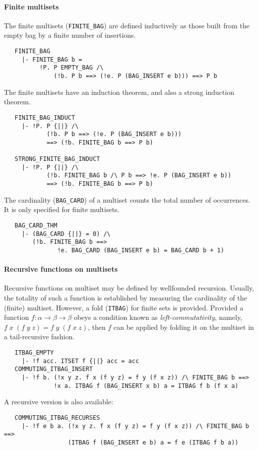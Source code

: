 \paragraph {Finite multisets}

The finite multisets ({\small\verb+FINITE_BAG+}) are defined inductively as those
built from the empty bag by a finite number of insertions.
%
{\small
\begin{verbatim}
   FINITE_BAG
     |- FINITE_BAG b =
          !P. P EMPTY_BAG /\
              (!b. P b ==> (!e. P (BAG_INSERT e b))) ==> P b
\end{verbatim}
}
%
\noindent The finite multisets have an induction theorem, and also a strong
induction theorem.
%
%
{\small
\begin{verbatim}
   FINITE_BAG_INDUCT
     |- !P. P {||} /\
            (!b. P b ==> (!e. P (BAG_INSERT e b)))
            ==> (!b. FINITE_BAG b ==> P b)

   STRONG_FINITE_BAG_INDUCT
     |- !P. P {||} /\
            (!b. FINITE_BAG b /\ P b ==> !e. P (BAG_INSERT e b))
            ==> (!b. FINITE_BAG b ==> P b)
\end{verbatim}
}
%
The cardinality ({\small\verb+BAG_CARD+}) of a multiset counts the
total number of occurrences. It is only specified for finite multisets.
%
{\small
\begin{verbatim}
   BAG_CARD_THM
     |- (BAG_CARD {||} = 0) /\
        (!b. FINITE_BAG b ==>
               !e. BAG_CARD (BAG_INSERT e b) = BAG_CARD b + 1)
\end{verbatim}
}

\paragraph{Recursive functions on multisets}

Recursive functions on multiset may be defined by wellfounded
recursion. Usually, the totality of such a function is established by
measuring the cardinality of the (finite) multiset. However,
a fold ({\small\verb+ITBAG+}) for finite sets is provided.
Provided a function $f:\alpha\to\beta\to\beta$ obeys a condition
known as \emph{left-commutativity}, namely, $f\;x\;(f\;y\;z) =
f\;y\;(f\;x\;z)$, then $f$ can be applied by folding it on the multiset
in a tail-recursive fashion.
%
{\small
\begin{verbatim}
   ITBAG_EMPTY
     |- !f acc. ITSET f {||} acc = acc
   COMMUTING_ITBAG_INSERT
     |- !f b. (!x y z. f x (f y z) = f y (f x z)) /\ FINITE_BAG b ==>
              !x a. ITBAG f (BAG_INSERT x b) a = ITBAG f b (f x a)
\end{verbatim}
}
%
\noindent A recursive version is also available:
{\small
\begin{verbatim}
   COMMUTING_ITBAG_RECURSES
     |- !f e b a. (!x y z. f x (f y z) = f y (f x z)) /\ FINITE_BAG b ==>
                  (ITBAG f (BAG_INSERT e b) a = f e (ITBAG f b a))
\end{verbatim}
}

